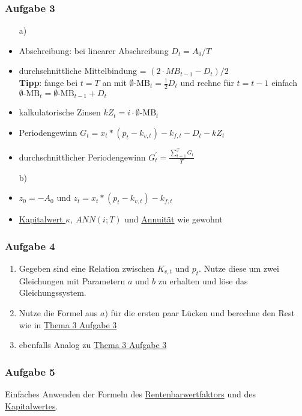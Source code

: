 \documentclass[12pt]{article}
\begin{document}
		\subsubsection*{Aufgabe 3} \label{Thema3Aufgabe3}
		\begin{itemize}
			\item[a)]
			\item Abschreibung: bei linearer Abschreibung $D_t=A_0/T$
			\item durchschnittliche Mittelbindung = $(2\cdot MB_{t-1}-D_t)/2$ \\
			\textbf{Tipp}: fange bei $t=T$ an mit $\emptyset\text{-MB}_{t}=\frac{1}{2}D_t$ und rechne für $t=t-1$ einfach $\emptyset\text{-MB}_{t}=\emptyset\text{-MB}_{t-1}+D_t$
			\item kalkulatorische Zinsen $kZ_t=i\cdot \emptyset\text{-MB}_t$
			\item Periodengewinn $G_t=x_t*(p_t-k_{v,t})-k_{f,t}-D_t-kZ_t$
			\item durchschnittlicher Periodengewinn $G_t^\prime=\frac{\sum_{t=1}^T G_t}{T}$
			\item[b)]
			\item $z_0=-A_0$ und $z_t=x_t*(p_t-k_{v,t})-k_{f,t}$
			\item \hyperref[Kapitalwert]{Kapitalwert $\kappa$}, \hyperref[Annuitaet]{$ANN(i;T)$} und \hyperref[Annuitaet]{Annuität} wie gewohnt
		\end{itemize}
	
		\subsubsection*{Aufgabe 4}
		\begin{enumerate}[label=\alph*)]
			\item Gegeben sind eine Relation zwischen $K_{v,t}$ und $p_t$. Nutze diese um zwei Gleichungen mit Parametern $a$ und $b$ zu erhalten und löse das Gleichungssystem.
			\item Nutze die Formel aus $a)$ für die ersten paar Lücken und berechne den Rest wie in \hyperref[Thema3Aufgabe3]{Thema 3 Aufgabe 3}
			\item ebenfalls Analog zu \hyperref[Thema3Aufgabe3]{Thema 3 Aufgabe 3}
		\end{enumerate}
	
		\subsubsection*{Aufgabe 5}
		Einfaches Anwenden der Formeln des \hyperref[Rentenbarwertfaktor]{Rentenbarwertfaktors} und des \hyperref[Kapitalwert]{Kapitalwertes}.
		
\end{document}
